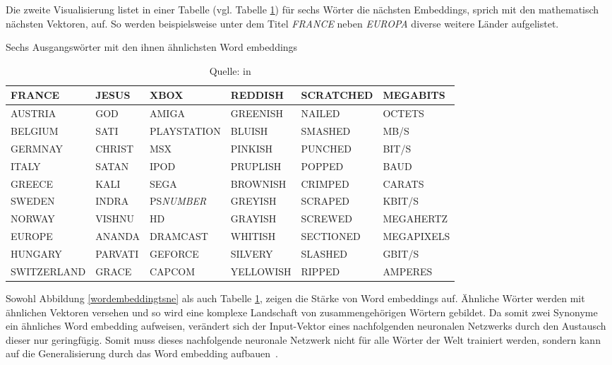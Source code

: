 Die zweite Visualisierung listet in einer Tabelle (vgl. Tabelle \ref{wordembeddingtable}) für sechs Wörter die nächsten Embeddings, sprich mit den mathematisch nächsten Vektoren, auf. So werden beispielsweise unter dem Titel \textit{FRANCE} neben \textit{EUROPA} diverse weitere Länder aufgelistet.
\begin{table}[h!]
\centering
    \captionsetup{width=.9\linewidth}
    \caption{Sechs Ausgangswörter mit den ihnen ähnlichsten Word embeddings}
    \label{wordembeddingtable}
    \renewcommand{\arraystretch}{1.25}
    \setlength{\tabcolsep}{3pt}
    \footnotesize
    \begin{tabular}{ | l | l | l | l | l | l |}
    \hline
    \rowcolor[HTML]{C0E5FD} FRANCE & JESUS & XBOX & REDDISH & SCRATCHED & MEGABITS \\ \hline
    AUSTRIA & GOD & AMIGA & GREENISH & NAILED & OCTETS \\ \hline
    BELGIUM & SATI & PLAYSTATION & BLUISH & SMASHED & MB/S \\ \hline
    GERMNAY& CHRIST & MSX & PINKISH & PUNCHED & BIT/S \\ \hline
    ITALY & SATAN & IPOD & PRUPLISH & POPPED & BAUD \\ \hline
    GREECE & KALI & SEGA & BROWNISH & CRIMPED & CARATS \\ \hline
    SWEDEN & INDRA & PS\textit{NUMBER} & GREYISH & SCRAPED & KBIT/S \\ \hline
    NORWAY & VISHNU & HD & GRAYISH & SCREWED & MEGAHERTZ \\ \hline
    EUROPE & ANANDA & DRAMCAST & WHITISH & SECTIONED & MEGAPIXELS \\ \hline
    HUNGARY & PARVATI & GEFORCE & SILVERY & SLASHED & GBIT/S \\ \hline
    SWITZERLAND & GRACE & CAPCOM & YELLOWISH & RIPPED & AMPERES \\ \hline
    \end{tabular}
    \vspace*{0.3cm}
    \caption*{Quelle: \textcite{Collobert2011} in \textcite{Olah2014b}}
\end{table}

Sowohl Abbildung \ref{wordembeddingtsne} als auch Tabelle \ref{wordembeddingtable}, zeigen die Stärke von Word embeddings auf. Ähnliche Wörter werden mit ähnlichen Vektoren versehen und so wird eine komplexe Landschaft von zusammengehörigen Wörtern gebildet. Da somit zwei Synonyme ein ähnliches Word embedding aufweisen, verändert sich der Input-Vektor eines nachfolgenden neuronalen Netzwerks durch den Austausch dieser nur geringfügig. Somit muss dieses nachfolgende neuronale Netzwerk nicht für alle Wörter der Welt trainiert werden, sondern kann auf die Generalisierung durch das Word embedding aufbauen~\autocite{Olah2014b}.


